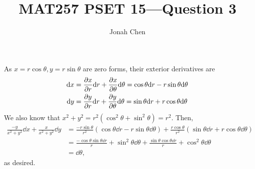 \documentclass{exam}
\title{MAT257 PSET 15---Question 3}
\author{Jonah Chen}
\date{}
\numberwithin{equation}{section}
\begin{document}
    \sffamily
    \maketitle
    As \(x=r\cos\theta,y=r\sin\theta\) are zero forms, their exterior derivatives are
    \begin{align*}
        \dd x&=\partialderivative{x}{r}\dd r+\partialderivative{x}{\theta}\dd\theta=\cos\theta\dd r-r\sin\theta\dd\theta\\
        \dd y&=\partialderivative{y}{r}\dd r+\partialderivative{y}{\theta}\dd\theta=\sin\theta\dd r+r\cos\theta\dd\theta
    \end{align*}
    We also know that \(x^2+y^2=r^2(\cos^2\theta+\sin^2\theta)=r^2.\) Then,
    \begin{align*}
        \frac{-y}{x^2+y^2}\dd x+\frac{x}{x^2+y^2}\dd y&=\frac{-r\sin\theta}{r^2}(\cos\theta\dd r-r\sin\theta\dd\theta)+\frac{r\cos\theta}{r^2}(\sin\theta\dd r+r\cos\theta\dd\theta)\\
        &=\frac{-\cos\theta\sin\theta\dd r}{r}+\sin^2\theta\dd\theta+\frac{\sin\theta\cos\theta\dd r}{r}+\cos^2\theta\dd\theta\\
        &=\dd\theta,
    \end{align*}
    as desired.
\end{document}

